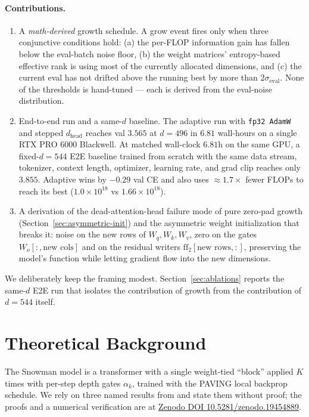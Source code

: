 \documentclass{article}
\begin{document}
\paragraph{Contributions.}
\begin{enumerate}
\item A \emph{math-derived} growth schedule.  A grow event fires only when
  three conjunctive conditions hold: (a) the per-FLOP information gain
  has fallen below the eval-batch noise floor, (b) the weight matrices'
  entropy-based effective rank is using most of the currently allocated
  dimensions, and (c) the current eval has not drifted above the running
  best by more than $2\sigma_{\text{eval}}$.  None of the thresholds is
  hand-tuned --- each is derived from the eval-noise distribution.
\item End-to-end run and a same-$d$ baseline.  The adaptive run with
  \texttt{fp32 AdamW} and stepped $d_{\text{head}}$ reaches val
  $3.565$ at $d{=}496$ in $6.81$ wall-hours on a single
  RTX PRO 6000 Blackwell.  At matched wall-clock $6.81$h on the same
  GPU, a fixed-$d{=}544$ E2E baseline trained from scratch with the
  same data stream, tokenizer, context length, optimizer, learning
  rate, and grad clip reaches only $3.855$.  Adaptive wins by $-0.29$
  val CE and also uses $\approx 1.7{\times}$ fewer FLOPs to reach its
  best ($1.0{\times}10^{18}$ vs $1.66{\times}10^{18}$).
\item A derivation of the dead-attention-head failure mode of pure zero-pad
  growth (Section~\ref{sec:asymmetric-init}) and the asymmetric weight
  initialization that breaks it: noise on the new rows of $W_q, W_k, W_v$,
  zero on the gates $W_o[:,\text{new cols}]$ and on the residual writers
  $\mathrm{ff}_2[\text{new rows},:]$, preserving the model's function while
  letting gradient flow into the new dimensions.
\end{enumerate}

We deliberately keep the framing modest.  Section~\ref{sec:ablations}
reports the same-$d$ E2E run that isolates the contribution of growth
from the contribution of $d{=}544$ itself.

\section{Theoretical Background}
\label{sec:theory}

The Snowman model is a transformer with a single weight-tied ``block''
applied $K$ times with per-step depth gates $\alpha_k$, trained with the
PAVING local backprop schedule.  We rely on three named results from
\citet{paving} and state them without proof; the proofs and a numerical
verification are at \href{https://doi.org/10.5281/zenodo.19454889}{Zenodo
DOI 10.5281/zenodo.19454889}.
\end{document}

